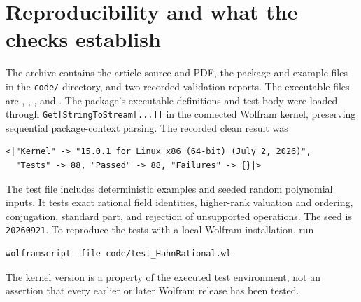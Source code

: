 \documentclass[11pt,letterpaper]{article}
\theoremstyle{definition}\newtheorem{definition}[theorem]{Definition}
\theoremstyle{remark}\newtheorem{remark}[theorem]{Remark}
\newcommand{\code}[1]{\texttt{#1}}
\numberwithin{equation}{section}\setcounter{tocdepth}{2}
\begin{document}
\appendix
\section{Reproducibility and what the checks establish}\label{app:repro}
The archive contains the article source and PDF, the package and example files in the \code{code/} directory, and two recorded validation reports. The executable files are , , , and . The package's executable definitions and test body were loaded through \code{Get[StringToStream[...]]} in the connected Wolfram kernel, preserving sequential package-context parsing. The recorded clean result was
\par\noindent\begin{minipage}{\textwidth}
\begin{lstlisting}
<|"Kernel" -> "15.0.1 for Linux x86 (64-bit) (July 2, 2026)",
  "Tests" -> 88, "Passed" -> 88, "Failures" -> {}|>
\end{lstlisting}
\end{minipage}\par
The test file includes deterministic examples and seeded random polynomial inputs. It tests exact rational field identities, higher-rank valuation and ordering, conjugation, standard part, and rejection of unsupported operations. The seed is \code{20260921}. To reproduce the tests with a local Wolfram installation, run
\par\noindent\begin{minipage}{\textwidth}
\begin{lstlisting}
wolframscript -file code/test_HahnRational.wl
\end{lstlisting}
\end{minipage}\par
The kernel version is a property of the executed test environment, not an assertion that every earlier or later Wolfram release has been tested.
\end{document}
